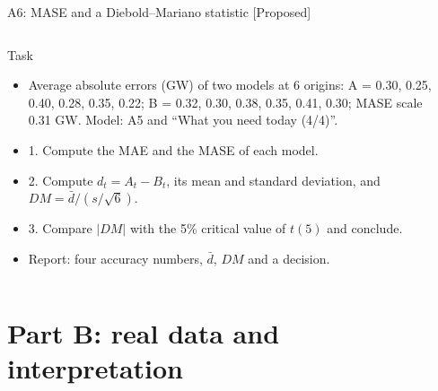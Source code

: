 \begin{frame}{A6: MASE and a Diebold--Mariano statistic [Proposed]}
\propsub
\itemsize{\scriptsize}
\begin{columns}[T]
\begin{column}{\taskw}
\begin{block}{Task}
\begin{itemize}
    \item Average absolute errors (GW) of two models at 6 origins: A = 0.30, 0.25, 0.40, 0.28, 0.35, 0.22; B = 0.32, 0.30, 0.38, 0.35, 0.41, 0.30; MASE scale 0.31 GW. Model: A5 and ``What you need today (4/4)''.
    \item 1. Compute the MAE and the MASE of each model.
    \item 2. Compute $d_t = A_t - B_t$, its mean and standard deviation, and $DM = \bar d/(s/\sqrt{6})$.
    \item 3. Compare $|DM|$ with the 5\% critical value of $t(5)$ and conclude.
    \item Report: four accuracy numbers, $\bar d$, $DM$ and a decision.
\end{itemize}
\end{block}
\end{column}
\begin{column}{\solw}
\end{column}
\end{columns}
\end{frame}


\section{Part B: real data and interpretation}

